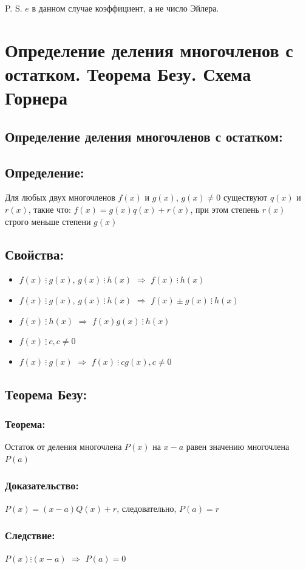 \documentclass[12pt]{article}
\begin{document}
P. S. $e$ в данном случае коэффициент, а не число Эйлера.

\section{Определение деления многочленов с остатком. Теорема Безу. Схема Горнера}
\subsection{Определение деления многочленов с остатком:}
\subsection{Определение:}
Для любых двух многочленов $f(x)$ и $g(x)$, $g(x)\neq {0}$ существуют $q(x)$ и $r(x)$, такие что: $f(x) = g(x)q(x) + r(x)$, при этом степень $r(x)$ строго меньше степени $g(x)$\par
\subsection{Свойства:}
\begin{itemize}
    \item $f(x) \ \vdots\ g(x)$, $g(x) \ \vdots\  h(x)$ $\Rightarrow$ $f(x) \ \vdots\ h(x)$
    \item $f(x) \ \vdots\ g(x)$, $g(x) \ \vdots\  h(x)$ $\Rightarrow$ $f(x){\pm}g(x) \ \vdots\ h(x)$
    \item $f(x) \ \vdots\ h(x)$ $\Rightarrow$ $f(x)g(x) \ \vdots\ h(x)$
    \item $f(x) \ \vdots\ c, c\neq{0}$
    \item $f(x) \ \vdots\ g(x)$ $\Rightarrow$ $f(x) \ \vdots\ cg(x), c\neq{0}$
\end{itemize}
\subsection{Теорема Безу:}
\subsubsection{Теорема:}
Остаток от деления многочлена $P(x)$ на $x-a$ равен значению многочлена $P(a)$
\subsubsection{Доказательство:}
$P(x) = (x − a)Q(x) + r$, следовательно, $P(a) = r$
\subsubsection{Следствие:}
$P(x) \vdots (x − a)$ $\Rightarrow$ $P(a) = 0$
\end{document}
